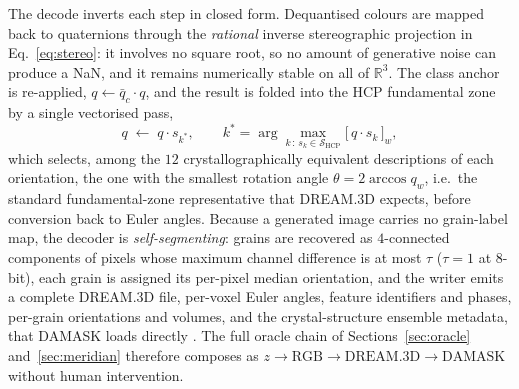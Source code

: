 \documentclass[preprint,12pt]{elsarticle}
\begin{document}
The decode inverts each step in closed form. Dequantised colours are mapped back to quaternions through the \emph{rational} inverse stereographic projection in Eq.~\eqref{eq:stereo}: it involves no square root, so no amount of generative noise can produce a NaN, and it remains numerically stable on all of $\mathbb{R}^3$. The class anchor is re-applied, $q \leftarrow \bar{q}_c \cdot q$, and the result is folded into the HCP fundamental zone by a single vectorised pass,
\begin{equation}
  q \;\leftarrow\; q \cdot s_{k^{*}} , \qquad
  k^{*} = \arg\max_{k \,:\, s_k \in \mathcal{S}_{\mathrm{HCP}}} \big[\, q \cdot s_k \,\big]_w ,
  \label{eq:fold}
\end{equation}
which selects, among the $12$ crystallographically equivalent descriptions of each orientation, the one with the smallest rotation angle $\theta = 2\arccos q_w$, i.e.\ the standard fundamental-zone representative that DREAM.3D expects, before conversion back to Euler angles. Because a generated image carries no grain-label map, the decoder is \emph{self-segmenting}: grains are recovered as $4$-connected components of pixels whose maximum channel difference is at most $\tau$ ($\tau = 1$ at $8$-bit), each grain is assigned its per-pixel median orientation, and the writer emits a complete DREAM.3D file, per-voxel Euler angles, feature identifiers and phases, per-grain orientations and volumes, and the crystal-structure ensemble metadata, that DAMASK loads directly \cite{groeber2014,Roters-DAMASK-2019}. The full oracle chain of Sections~\ref{sec:oracle} and~\ref{sec:meridian} therefore composes as $z \rightarrow \mathrm{RGB} \rightarrow \mathrm{DREAM.3D} \rightarrow \mathrm{DAMASK}$ without human intervention.
\end{document}
